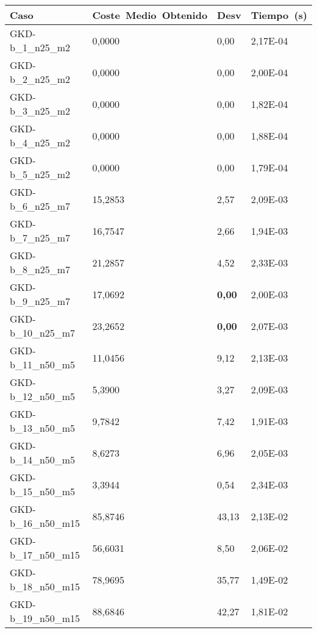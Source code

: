 \pagebreak

\begin{table}[!ht]%
    \centering    
    \begin{adjustbox}{height=12cm}
    \begin{tabular}{|l|l|l|l|}
    \hline
        Caso & Coste~Medio~Obtenido & Desv & Tiempo~(s) \\ \hline
        GKD-b\_1\_n25\_m2    & 0,0000   & 0,00          & 2,17E-04 \\ \hline
        GKD-b\_2\_n25\_m2    & 0,0000   & 0,00          & 2,00E-04 \\ \hline
        GKD-b\_3\_n25\_m2    & 0,0000   & 0,00          & 1,82E-04 \\ \hline
        GKD-b\_4\_n25\_m2    & 0,0000   & 0,00          & 1,88E-04 \\ \hline
        GKD-b\_5\_n25\_m2    & 0,0000   & 0,00          & 1,79E-04 \\ \hline
        GKD-b\_6\_n25\_m7    & 15,2853  & 2,57          & 2,09E-03 \\ \hline
        GKD-b\_7\_n25\_m7    & 16,7547  & 2,66          & 1,94E-03 \\ \hline
        GKD-b\_8\_n25\_m7    & 21,2857  & 4,52          & 2,33E-03 \\ \hline
        GKD-b\_9\_n25\_m7    & 17,0692  & \textbf{0,00} & 2,00E-03 \\ \hline
        GKD-b\_10\_n25\_m7   & 23,2652  & \textbf{0,00} & 2,07E-03 \\ \hline
        GKD-b\_11\_n50\_m5   & 11,0456  & 9,12          & 2,13E-03 \\ \hline
        GKD-b\_12\_n50\_m5   & 5,3900   & 3,27          & 2,09E-03 \\ \hline
        GKD-b\_13\_n50\_m5   & 9,7842   & 7,42          & 1,91E-03 \\ \hline
        GKD-b\_14\_n50\_m5   & 8,6273   & 6,96          & 2,05E-03 \\ \hline
        GKD-b\_15\_n50\_m5   & 3,3944   & 0,54          & 2,34E-03 \\ \hline
        GKD-b\_16\_n50\_m15  & 85,8746  & 43,13         & 2,13E-02 \\ \hline
        GKD-b\_17\_n50\_m15  & 56,6031  & 8,50          & 2,06E-02 \\ \hline
        GKD-b\_18\_n50\_m15  & 78,9695  & 35,77         & 1,49E-02 \\ \hline
        GKD-b\_19\_n50\_m15  & 88,6846  & 42,27         & 1,81E-02 \\ \hline

\end{tabular}
\end{adjustbox}
\end{table}

